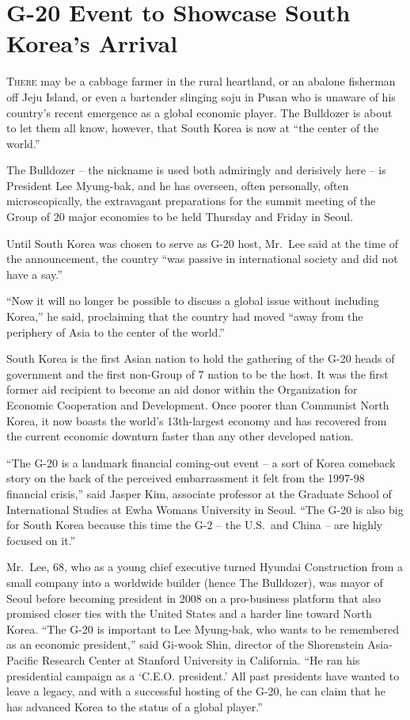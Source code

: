 ﻿\documentclass[12pt]{article}
\begin{document}
\section{G-20 Event to Showcase South Korea's Arrival}

\lettrine{T}{here} may be a cabbage farmer in the rural heartland, or an
abalone fisherman off Jeju Island, or even a bartender slinging soju in Pusan who is unaware of his
country's recent emergence as a global economic player. The Bulldozer is about to let them all know,
however, that South Korea is now at ``the center of the world.''

The Bulldozer -- the nickname is used both admiringly and derisively here -- is President Lee
Myung-bak, and he has overseen, often personally, often microscopically, the extravagant
preparations for the summit meeting of the Group of 20 major economies to be held Thursday and
Friday in Seoul.

Until South Korea was chosen to serve as G-20 host, Mr.~Lee said at the time of the announcement,
the country ``was passive in international society and did not have a say.''

``Now it will no longer be possible to discuss a global issue without including Korea,'' he said,
proclaiming that the country had moved ``away from the periphery of Asia to the center of the
world.''

South Korea is the first Asian nation to hold the gathering of the G-20 heads of government and the
first non-Group of 7 nation to be the host. It was the first former aid recipient to become an aid
donor within the Organization for Economic Cooperation and Development. Once poorer than Communist
North Korea, it now boasts the world's 13th-largest economy and has recovered from the current
economic downturn faster than any other developed nation.

``The G-20 is a landmark financial coming-out event -- a sort of Korea comeback story on the back of
the perceived embarrassment it felt from the 1997-98 financial crisis,'' said Jasper Kim, associate
professor at the Graduate School of International Studies at Ewha Womans University in Seoul. ``The
G-20 is also big for South Korea because this time the G-2 -- the U.S.~and China -- are highly
focused on it.''

Mr.~Lee, 68, who as a young chief executive turned Hyundai Construction from a small company into a
worldwide builder (hence The Bulldozer), was mayor of Seoul before becoming president in 2008 on a
pro-business platform that also promised closer ties with the United States and a harder line toward
North Korea. ``The G-20 is important to Lee Myung-bak, who wants to be remembered as an economic
president,'' said Gi-wook Shin, director of the Shorenstein Asia-Pacific Research Center at Stanford
University in California. ``He ran his presidential campaign as a `C.E.O. president.' All past
presidents have wanted to leave a legacy, and with a successful hosting of the G-20, he can claim
that he has advanced Korea to the status of a global player.''
\end{document}
